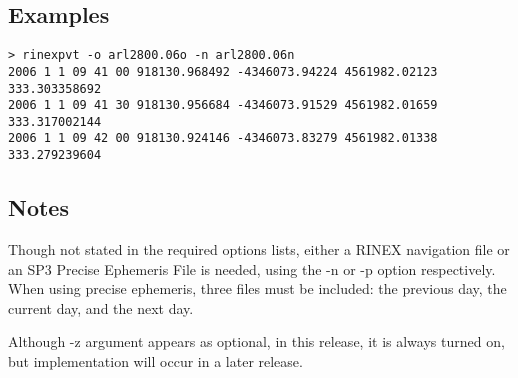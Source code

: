 \subsection{Examples}
\begin{\outputsize}
\begin{verbatim}
> rinexpvt -o arl2800.06o -n arl2800.06n
2006 1 1 09 41 00 918130.968492 -4346073.94224 4561982.02123 333.303358692
2006 1 1 09 41 30 918130.956684 -4346073.91529 4561982.01659 333.317002144
2006 1 1 09 42 00 918130.924146 -4346073.83279 4561982.01338 333.279239604
\end{verbatim}
\end{\outputsize}
\subsection{Notes}
Though not stated in the required options lists, either a RINEX navigation file or an SP3 Precise Ephemeris File is needed, using the -n or -p option respectively. When using precise ephemeris, three files must be included: the previous day, the current day, and the next day. 

Although -z argument appears as optional, in this release, it is always turned on, but implementation will occur in a later release.
%


